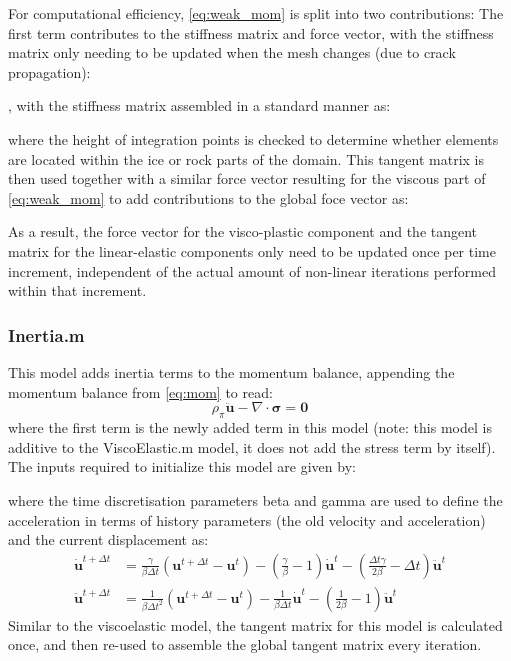 \documentclass[3p]{elsarticle} %
\begin{document}
For computational efficiency, \cref{eq:weak_mom} is split into two contributions: The first term contributes to the stiffness matrix and force vector, with the stiffness matrix only needing to be updated when the mesh changes (due to crack propagation):

, with the stiffness matrix assembled in a standard manner as:

where the height of integration points is checked to determine whether elements are located within the ice or rock parts of the domain. This tangent matrix is then used together with a similar force vector resulting for the viscous part of \cref{eq:weak_mom} to add contributions to the global foce vector as:

As a result, the force vector for the visco-plastic component and the tangent matrix for the linear-elastic components only need to be updated once per time increment, independent of the actual amount of non-linear iterations performed within that increment.

\subsubsection{Inertia.m}
This model adds inertia terms to the momentum balance, appending the momentum balance from \cref{eq:mom} to read:
\begin{equation}
	\rho_\pi \ddot{\mathbf{u}} - \nabla \cdot \mathbf{\sigma} = \mathbf{0}
\end{equation}
where the first term is the newly added term in this model (note: this model is additive to the ViscoElastic.m model, it does not add the stress term by itself). The inputs required to initialize this model are given by:

where the time discretisation parameters beta and gamma are used to define the acceleration in terms of history parameters (the old velocity and acceleration) and the current displacement as:
\begin{align}
     \dot{\mathbf{u}}^{t+\Delta t} &= \frac{\gamma}{\beta \Delta t} \left(\mathbf{u}^{t+\Delta t} - \mathbf{u}^t \right) - \left( \frac{\gamma}{\beta} - 1\right) \dot{\mathbf{u}}^t - \left(\frac{\Delta t \gamma}{2\beta} - \Delta t\right) \ddot{\mathbf{u}}^t \\
    \ddot{\mathbf{u}}^{t+\Delta t} &= \frac{1}{\beta \Delta t^2}  \left(\mathbf{u}^{t+\Delta t} - \mathbf{u}^t \right) - \frac{1}{\beta \Delta t} \dot{\mathbf{u}}^t - \left(\frac{1}{2\beta} - 1\right) \ddot{\mathbf{u}}^t 
\end{align}
Similar to the viscoelastic model, the tangent matrix for this model is calculated once, and then re-used to assemble the global tangent matrix every iteration. 
\end{document}

